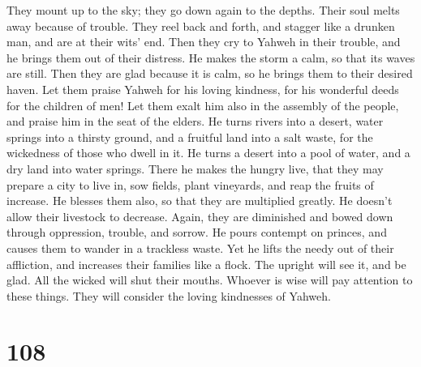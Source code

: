  They mount up to the sky; they go down again to the
depths. Their soul melts away because of trouble.  They
reel back and forth, and stagger like a drunken man, and are at their
wits' end.  Then they cry to Yahweh in their trouble, and
he brings them out of their distress.  He makes the storm
a calm, so that its waves are still.  Then they are glad
because it is calm, so he brings them to their desired haven.
 Let them praise Yahweh for his loving kindness, for his
wonderful deeds for the children of men!  Let them exalt
him also in the assembly of the people, and praise him in the seat of
the elders.  He turns rivers into a desert, water springs
into a thirsty ground,  and a fruitful land into a salt
waste, for the wickedness of those who dwell in it.  He
turns a desert into a pool of water, and a dry land into water springs.
 There he makes the hungry live, that they may prepare a
city to live in,  sow fields, plant vineyards, and reap
the fruits of increase.  He blesses them also, so that
they are multiplied greatly. He doesn't allow their livestock to
decrease.  Again, they are diminished and bowed down
through oppression, trouble, and sorrow.  He pours
contempt on princes, and causes them to wander in a trackless waste.
 Yet he lifts the needy out of their affliction, and
increases their families like a flock.  The upright will
see it, and be glad. All the wicked will shut their mouths.
 Whoever is wise will pay attention to these things. They
will consider the loving kindnesses of Yahweh.

\hypertarget{section-107}{%
\section{108}\label{section-107}}

